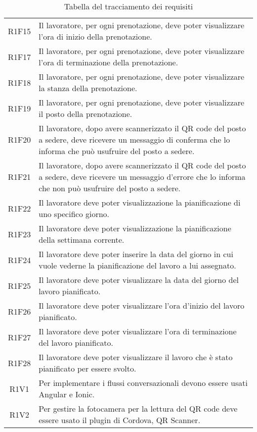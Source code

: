 \begin{table}[h]%
	\renewcommand{\arraystretch}{1.4}
	\centering
	\begin{tabularx}{\textwidth}{c X}
		\hline		
		\rowcolor{giallo}
		\intest{Codice} &  \intest{Descrizione} \\	
		\hline		
		R1F15 & Il lavoratore, per ogni prenotazione, deve poter visualizzare l'ora di inizio della prenotazione.\\
		R1F17 & Il lavoratore, per ogni prenotazione, deve poter visualizzare l'ora di terminazione della prenotazione.\\	
		R1F18 & Il lavoratore, per ogni prenotazione, deve poter visualizzare la stanza della prenotazione.\\
		R1F19 & Il lavoratore, per ogni prenotazione, deve poter visualizzare il posto della prenotazione.\\	
		R1F20 & Il lavoratore, dopo avere scannerizzato il \gls{QR code}\ap{[g]} del posto a sedere, deve ricevere un messaggio di conferma che lo informa che può usufruire del posto a sedere.\\
		R1F21 & Il lavoratore, dopo avere scannerizzato il \gls{QR code}\ap{[g]} del posto a sedere, deve ricevere un messaggio d'errore che lo informa che non può usufruire del posto a sedere.\\
		R1F22 & Il lavoratore deve poter visualizzazione la pianificazione di uno specifico giorno.\\
		R1F23 & Il lavoratore deve poter visualizzazione la pianificazione della settimana corrente.\\
		R1F24 & Il lavoratore deve poter inserire la data del giorno in cui vuole vederne la pianificazione del lavoro a lui assegnato.\\
		R1F25 & Il lavoratore deve poter visualizzare la data del giorno del lavoro pianificato.\\
		R1F26 & Il lavoratore deve poter visualizzare l'ora d'inizio del lavoro pianificato.\\
		R1F27 & Il lavoratore deve poter visualizzare l'ora di terminazione del lavoro pianificato.\\
		R1F28 & Il lavoratore deve poter visualizzare il lavoro che è stato pianificato per essere svolto.\\
		R1V1 & Per implementare i flussi conversazionali devono essere usati Angular e Ionic.\\
		R1V2 & Per gestire la fotocamera per la lettura del \gls{QR code}\ap{[g]} deve essere usato il plugin di Cordova, QR Scanner.\\
		
		\hline	
	\end{tabularx} \hbox{}
	\caption{Tabella del tracciamento dei requisiti}
\end{table}%
\clearpage
